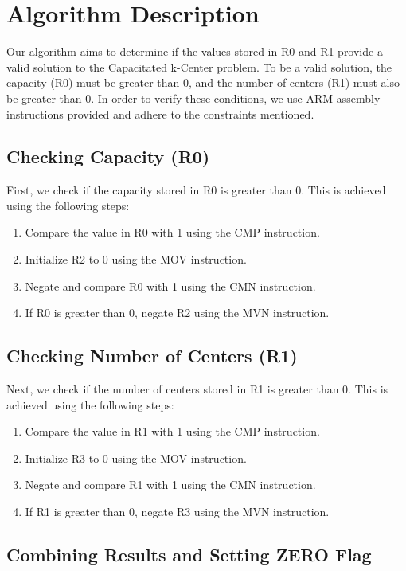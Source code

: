 \section{Algorithm Description}

Our algorithm aims to determine if the values stored in R0 and R1 provide a valid solution to the Capacitated k-Center problem. To be a valid solution, the capacity (R0) must be greater than 0, and the number of centers (R1) must also be greater than 0. In order to verify these conditions, we use ARM assembly instructions provided and adhere to the constraints mentioned.

\subsection{Checking Capacity (R0)}

First, we check if the capacity stored in R0 is greater than 0. This is achieved using the following steps:

\begin{enumerate}
    \item Compare the value in R0 with 1 using the CMP instruction.
    \item Initialize R2 to 0 using the MOV instruction.
    \item Negate and compare R0 with 1 using the CMN instruction.
    \item If R0 is greater than 0, negate R2 using the MVN instruction.
\end{enumerate}

\subsection{Checking Number of Centers (R1)}

Next, we check if the number of centers stored in R1 is greater than 0. This is achieved using the following steps:

\begin{enumerate}
    \item Compare the value in R1 with 1 using the CMP instruction.
    \item Initialize R3 to 0 using the MOV instruction.
    \item Negate and compare R1 with 1 using the CMN instruction.
    \item If R1 is greater than 0, negate R3 using the MVN instruction.
\end{enumerate}

\subsection{Combining Results and Setting ZERO Flag}

